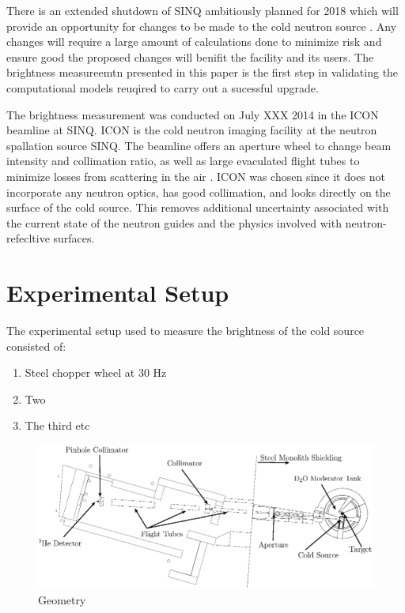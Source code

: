 \documentclass[preprint,12pt]{elsarticle}
\begin{document}
There is an extended shutdown of SINQ ambitiously planned for 2018 which will provide an opportunity for changes to be made to the cold neutron source \cite{rueegg_icans}.  Any changes will require a large amount of calculations done to minimize risk and ensure good the proposed changes will benifit the facility and its users.  The brightness measureemtn presented in this paper is the first step in validating the computational models reuqired to carry out a sucessful upgrade.  

The brightness measurement was conducted on July XXX 2014 in the ICON beamline at SINQ.  ICON is the cold neutron imaging facility at the neutron spallation source SINQ. The beamline offers an aperture wheel to change beam intensity and collimation ratio, as well as large evaculated flight tubes to minimize losses from scattering in the air \cite{icon}.  ICON was chosen since it does not incorporate any neutron optics, has good collimation, and looks directly on the surface of the cold source.  This removes additional uncertainty associated with the current state of the neutron guides and the physics involved with neutron-refecltive surfaces.

\section{Experimental Setup}
\label{sec:setup}

The experimental setup used to measure the brightness of the cold source consisted of:

\begin{enumerate}
  \item Steel chopper wheel at 30 Hz
  \item Two 
  \item The third etc
\end{enumerate}

\begin{figure}[h!] 
  \centering
    \includegraphics[width=\textwidth]{graphics/geom_bw_labels.eps}
     \caption{Geometry \label{geom} }
\end{figure}
\end{document}
